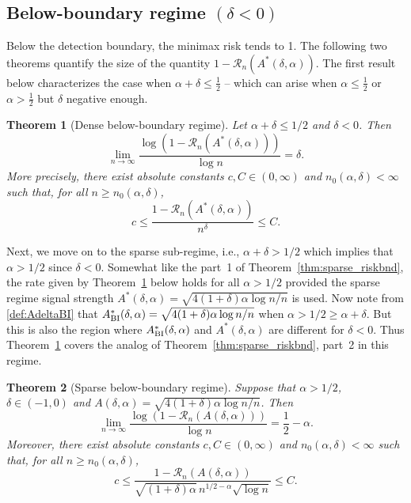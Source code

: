 \documentclass[11pt,reqno,letterpaper]{amsart}
\numberwithin{equation}{section}
\theoremstyle{plain}
\newtheorem{theorem}{Theorem}[section]
\begin{document}
\subsection{Below-boundary regime $(\delta < 0)$}\label{subsec:main_below_bnd}
Below the detection boundary, the minimax risk tends to 1. The following two theorems quantify the size of the quantity $1-\mathcal R_n(A^\ast(\delta, \alpha))$. The first result below characterizes the case when $\alpha+\delta\leq\frac{1}{2}$ -- which can arise when $\alpha\leq \frac{1}{2}$ or $\alpha>\frac{1}{2}$ but $\delta$ negative enough. 
\begin{theorem}[Dense below-boundary regime]\label{thm:dense_below_boundary}
Let $\alpha+\delta\le1/2$ and $\delta < 0$. Then
\begin{equation}\label{eq:dense_below_boundary0}
\lim_{n\to\infty}
\frac{\log(1-\mathcal R_n(A^\ast(\delta, \alpha)))}{\log n} =\delta.
\end{equation}
More precisely, there exist absolute constants $c,C\in(0,\infty)$ and $n_0(\alpha,\delta)<\infty$ such that, for all $n\ge n_0(\alpha,\delta)$,
\begin{equation}\label{eq:dense_below_boundary}
    c\le
    \frac{1-\mathcal R_n(A^\ast(\delta, \alpha))}{n^\delta}
    \le C.
\end{equation}
\end{theorem}
Next, we move on to the sparse sub-regime, i.e., $\alpha + \delta > 1/2$ which implies 
that $\alpha > 1/2$ since $\delta < 0$. Somewhat like the part~1 of Theorem~\ref{thm:sparse_riskbnd}, the rate given by Theorem~\ref{thm:dense_below_boundary} below holds for all $\alpha > 1/2$ provided 
the sparse regime signal strength $A^\ast(\delta, \alpha) = 
\sqrt{4(1+\delta)\alpha\log n / n}$ is used. Now note from \eqref{def:AdeltaBI} that $A^\ast_{{\rm BI}}(\delta, \alpha) = \sqrt{4(1+\delta)\alpha\log n / n}$ when $\alpha > 1/2 \ge \alpha + \delta$. But this is also the region where $A^\ast_{{\rm BI}}(\delta, \alpha)$ and $A^\ast(\delta, \alpha)$ are different for $\delta < 0$. 
Thus Theorem~\ref{thm:dense_below_boundary} covers the analog of Theorem~\ref{thm:sparse_riskbnd}, part~2 in this regime.
\begin{theorem}[Sparse below-boundary regime]\label{thm:sparse_below_boundary}
Suppose that $\alpha>1/2$, $\delta\in(-1,0)$ and $A(\delta, \alpha) = \sqrt{4(1+\delta)\alpha\log n / n}$. Then
\begin{equation}\label{eq:sparse_below_boundary0}
\lim_{n\to\infty}
\frac{\log(1-\mathcal R_n(A(\delta, \alpha)))}{\log n}
=\frac12-\alpha.
\end{equation}
Moreover, there exist absolute constants $c,C\in(0,\infty)$ and $n_0(\alpha,\delta)<\infty$ such that, for all $n\ge n_0(\alpha,\delta)$,
\begin{equation}\label{eq:sparse_below_boundary}
    c\le
    \frac{1-\mathcal R_n(A(\delta, \alpha))}{\sqrt{(1+\delta)\alpha}\,n^{1/2-\alpha}\sqrt{\log n}}
    \le C.
\end{equation}
\end{theorem}
\end{document}
